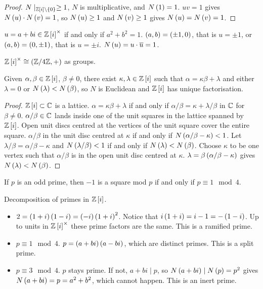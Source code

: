 \begin{proof}
$ N \mid_{\mathbb{Z}\left[ i \right] \setminus \left\{ 0 \right\}} \ge 1 $, $ N $ is multiplicative, and $ N\left( 1 \right) = 1 $. $ uv = 1 $ gives $ N\left( u \right) \cdot N\left( v \right) = 1 $, so $ N\left( u \right) \ge 1 $ and $ N\left( v \right) \ge 1 $ gives $ N\left( u \right) = N\left( v \right) = 1 $.
\end{proof}

$ u = a + bi \in \mathbb{Z}\left[ i \right]^\times $ if and only if $ a^2 + b^2 = 1 $. $ \left( a, b \right) = \left( \pm 1, 0 \right) $, that is $ u = \pm 1 $, or $ \left( a, b \right) = \left( 0, \pm 1 \right) $, that is $ u = \pm i $. $ N\left( u \right) = u \cdot \overline{u} = 1 $.

\begin{remark1}
$ \mathbb{Z}\left[ i \right]^\times \cong \left( \mathbb{Z} / 4\mathbb{Z}, + \right) $ as groups.
\end{remark1}

\begin{proposition}
Given $ \alpha, \beta \in \mathbb{Z}\left[ i \right] $, $ \beta \ne 0 $, there exist $ \kappa, \lambda \in \mathbb{Z}\left[ i \right] $ such that $ \alpha = \kappa\beta + \lambda $ and either $ \lambda = 0 $ or $ N\left( \lambda \right) < N\left( \beta \right) $, so $ N $ is Euclidean and $ \mathbb{Z}\left[ i \right] $ has unique factorisation.
\end{proposition}

\begin{proof}
$ \mathbb{Z}\left[ i \right] \subset \mathbb{C} $ is a lattice. $ \alpha = \kappa\beta + \lambda $ if and only if $ \alpha / \beta = \kappa + \lambda / \beta $ in $ \mathbb{C} $ for $ \beta \ne 0 $. $ \alpha / \beta \in \mathbb{C} $ lands inside one of the unit squares in the lattice spanned by $ \mathbb{Z}\left[ i \right] $. Open unit discs centred at the vertices of the unit square cover the entire square. $ \alpha / \beta $ in the unit disc centred at $ \kappa $ if and only if $ N\left( \alpha / \beta - \kappa \right) < 1 $. Let $ \lambda / \beta = \alpha / \beta - \kappa $ and $ N\left( \lambda / \beta \right) < 1 $ if and only if $ N\left( \lambda \right) < N\left( \beta \right) $. Choose $ \kappa $ to be one vertex such that $ \alpha / \beta $ is in the open unit disc centred at $ \kappa $. $ \lambda = \beta\left( \alpha / \beta - \kappa \right) $ gives $ N\left( \lambda \right) < N\left( \beta \right) $.
\end{proof}

\begin{lemma}
If $ p $ is an odd prime, then $ -1 $ is a square mod $ p $ if and only if $ p \equiv 1 \mod 4 $.
\end{lemma}

Decomposition of primes in $ \mathbb{Z}\left[ i \right] $.
\begin{itemize}
\item $ 2 = \left( 1 + i \right)\left( 1 - i \right) = \left( -i \right)\left( 1 + i \right)^2 $. Notice that $ i\left( 1 + i \right) = i - 1 = -\left( 1 - i \right) $. Up to units in $ \mathbb{Z}\left[ i \right]^\times $ these prime factors are the same. This is a ramified prime.
\item $ p \equiv 1 \mod 4 $. $ p = \left( a + bi \right)\left( a - bi \right) $, which are distinct primes. This is a split prime.
\item $ p \equiv 3 \mod 4 $. $ p $ stays prime. If not, $ a + bi \mid p $, so $ N\left( a + bi \right) \mid N\left( p \right) = p^2 $ gives $ N\left( a + bi \right) = p = a^2 + b^2 $, which cannot happen. This is an inert prime.
\end{itemize}


